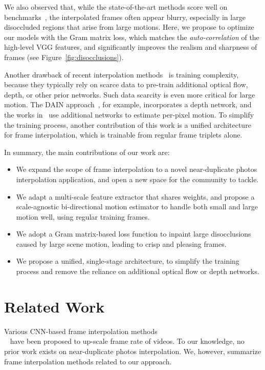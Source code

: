 \documentclass[runningheads]{llncs}
\newcommand{\newedit}[1]{ {\color{cyan} {#1}}}
\newcommand{\newedit}[1]{{#1}}
\begin{document}
We also observed that, while the state-of-the-art methods score well on benchmarks~\cite{ucf101,middlebury,vimeo}, the interpolated frames often appear blurry, especially in large disoccluded regions that arise from large motions. Here, we propose to optimize our models with the Gram matrix loss, which matches the {\em auto-correlation} of the high-level VGG features, and significantly improves the realism and sharpness of frames (see Figure~\ref{fig:disocclusions}). 

\newedit{Another drawback of recent interpolation methods~\cite{softsplat-2020,dain-2019,abme-2021,zhang2020flexible} is training complexity, because they typically rely on scarce data to pre-train additional optical flow, depth, or other prior networks.} Such data scarcity is even more critical for large motion. The DAIN approach~\cite{dain-2019}, for example, incorporates a depth network, and the works in~\cite{softsplat-2020,abme-2021} use additional networks to estimate per-pixel motion. 
\newedit{To simplify the training process, another contribution of this work is a unified architecture for frame interpolation, which is trainable from regular frame triplets alone.}






In summary, the main contributions of our work are:
\begin{itemize}
  \item We expand the scope of frame interpolation to a novel near-duplicate photos interpolation application, and open a new space for the community to tackle.  
  \item We adapt a multi-scale feature extractor that shares weights, and propose a scale-agnostic bi-directional motion estimator to handle both small and large motion well, using regular training frames. 
  \item We adopt a Gram matrix-based loss function to inpaint large disocclusions caused by large scene motion, leading to crisp and pleasing frames. \item We propose a unified, single-stage architecture, to simplify the training process and remove the reliance on additional optical flow or depth networks. \end{itemize}
 \section{Related Work}
\label{sec:related}
Various CNN-based frame interpolation methods~\cite{superslomo-2017,dain-2019,sepconv-2017,softsplat-2020,cdfi-2021,huang2020rife,zhang2020flexible,adacof-2020,bmbc-2021,abme-2021,zooming-slomo}\\~\cite{reda-cycle,cyclic-gen} have been proposed to up-scale frame rate of videos. To our knowledge, no prior work exists on near-duplicate photos interpolation. We, however, summarize frame interpolation methods related to our approach.
\end{document}
